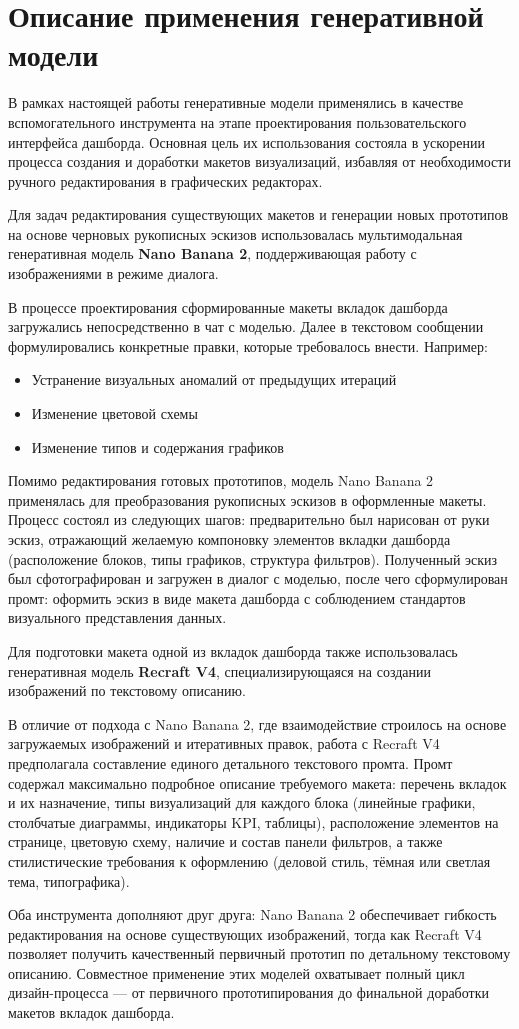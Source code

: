 \section{Описание применения генеративной модели}

В рамках настоящей работы генеративные модели применялись в качестве вспомогательного инструмента на этапе проектирования пользовательского интерфейса дашборда. Основная цель их использования состояла в ускорении процесса создания и доработки макетов визуализаций, избавляя от необходимости ручного редактирования в графических редакторах.

Для задач редактирования существующих макетов и генерации новых прототипов на основе черновых рукописных эскизов использовалась мультимодальная генеративная модель \textbf{Nano Banana 2}, поддерживающая работу с изображениями в режиме диалога.

В процессе проектирования сформированные макеты вкладок дашборда загружались непосредственно в чат с моделью. Далее в текстовом сообщении формулировались конкретные правки, которые требовалось внести. Например:

\begin{itemize}
    \item Устранение визуальных аномалий от предыдущих итераций
    \item Изменение цветовой схемы
    \item Изменение типов и содержания графиков
\end{itemize}

Помимо редактирования готовых прототипов, модель Nano Banana 2 применялась для преобразования рукописных эскизов в оформленные макеты. Процесс состоял из следующих шагов: предварительно был нарисован от руки эскиз, отражающий желаемую компоновку элементов вкладки дашборда (расположение блоков, типы графиков, структура фильтров). Полученный эскиз был сфотографирован и загружен в диалог с моделью, после чего сформулирован промт: оформить эскиз в виде макета дашборда с соблюдением стандартов визуального представления данных.

Для подготовки макета одной из вкладок дашборда также использовалась генеративная модель \textbf{Recraft V4}, специализирующаяся на создании изображений по текстовому описанию.

В отличие от подхода с Nano Banana 2, где взаимодействие строилось на основе загружаемых изображений и итеративных правок, работа с Recraft V4 предполагала составление единого детального текстового промта. Промт содержал максимально подробное описание требуемого макета: перечень вкладок и их назначение, типы визуализаций для каждого блока (линейные графики, столбчатые диаграммы, индикаторы KPI, таблицы), расположение элементов на странице, цветовую схему, наличие и состав панели фильтров, а также стилистические требования к оформлению (деловой стиль, тёмная или светлая тема, типографика).

Оба инструмента дополняют друг друга: Nano Banana 2 обеспечивает гибкость редактирования на основе существующих изображений, тогда как Recraft V4 позволяет получить качественный первичный прототип по детальному текстовому описанию. Совместное применение этих моделей охватывает полный цикл дизайн-процесса — от первичного прототипирования до финальной доработки макетов вкладок дашборда.
